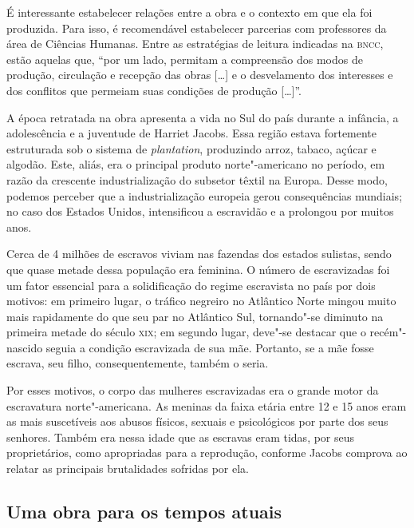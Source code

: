 \documentclass[11pt]{extarticle}
\begin{document}
É interessante estabelecer relações entre a obra e o contexto em que ela
foi produzida. Para isso, é recomendável estabelecer parcerias com
professores da área de Ciências Humanas. Entre as estratégias de leitura
indicadas na \textsc{bncc}, estão aquelas que, ``por um lado, permitam a
compreensão dos modos de produção, circulação e recepção das obras
{[}\ldots{}{]} e o desvelamento dos interesses e dos conflitos que permeiam
suas condições de produção {[}\ldots{}{]}''.

A época retratada na obra apresenta a vida no Sul do país durante a
infância, a adolescência e a juventude de Harriet Jacobs. Essa região
estava fortemente estruturada sob o sistema de \textit{plantation}, produzindo
arroz, tabaco, açúcar e algodão. Este, aliás, era o principal produto
norte"-americano no período, em razão da crescente industrialização do
subsetor têxtil na Europa. Desse modo, podemos perceber que a
industrialização europeia gerou consequências mundiais; no caso dos
Estados Unidos, intensificou a escravidão e a prolongou por muitos anos.

Cerca de 4 milhões de escravos viviam nas fazendas dos estados sulistas,
sendo que quase metade dessa população era feminina. O número de
escravizadas foi um fator essencial para a solidificação do regime
escravista no país por dois motivos: em primeiro lugar, o tráfico
negreiro no Atlântico Norte mingou muito mais rapidamente do que seu par
no Atlântico Sul, tornando"-se diminuto na primeira metade do século \textsc{xix};
em segundo lugar, deve"-se destacar que o recém"-nascido seguia a condição
escravizada de sua mãe. Portanto, se a mãe fosse escrava, seu filho,
consequentemente, também o seria.

Por esses motivos, o corpo das mulheres escravizadas era o grande motor
da escravatura norte"-americana. As meninas da faixa etária entre 12 e 15
anos eram as mais suscetíveis aos abusos físicos, sexuais e psicológicos
por parte dos seus senhores. Também era nessa idade que as escravas eram
tidas, por seus proprietários, como apropriadas para a reprodução,
conforme Jacobs comprova ao relatar as principais brutalidades sofridas
por ela.




\subsection{Uma obra para os tempos atuais}
\end{document}
